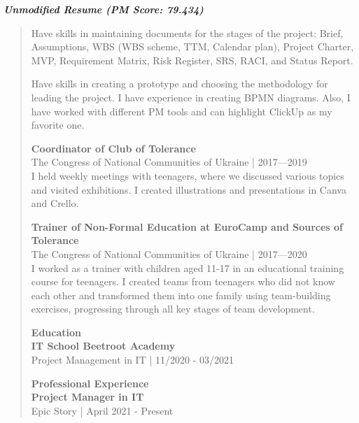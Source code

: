     \textbf{\textit{\large Unmodified Resume (PM Score: 79.434)}}
    \begin{quote}
        Have skills in maintaining documents for the stages of the project: Brief, Assumptions, WBS (WBS scheme, TTM, Calendar plan), Project Charter, MVP, Requirement Matrix, Risk Register, SRS, RACI, and Status Report.
        
        Have skills in creating a prototype and choosing the methodology for leading the project. I have experience in creating BPMN diagrams. Also, I have worked with different PM tools and can highlight ClickUp as my favorite one.
        
        \textbf{Coordinator of Club of Tolerance} \\
        The Congress of National Communities of Ukraine | 2017—2019 \\
        I held weekly meetings with teenagers, where we discussed various topics and visited exhibitions. I created illustrations and presentations in Canva and Crello.
        
        \textbf{Trainer of Non-Formal Education at EuroCamp and Sources of Tolerance} \\
        The Congress of National Communities of Ukraine | 2017—2020 \\
        I worked as a trainer with children aged 11-17 in an educational training course for teenagers. I created teams from teenagers who did not know each other and transformed them into one family using team-building exercises, progressing through all key stages of team development.
        
        \textbf{Education} \\
        \textbf{IT School Beetroot Academy} \\
        Project Management in IT | 11/2020 - 03/2021
        
        \textbf{Professional Experience} \\
        \textbf{Project Manager in IT} \\
        Epic Story | April 2021 - Present
    \end{quote}
        
